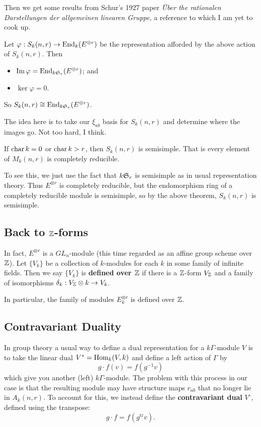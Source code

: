 \documentclass[12pt]{article}
\DeclareMathOperator{\1}{\mathbbm{1}}
\begin{document}
Then we get some results from Schur's 1927 paper \textit{\"Uber the rationalen Darstellungen der allgemeinen linearen Gruppe}, a reference to which I am yet to cook up.
\begin{thm}[Schur]
	Let $\varphi:S_k(n,r)\to \operatorname{End}_k(E^{\otimes r})$ be the representation afforded by the above action of $S_k(n,r)$. Then 
	\begin{itemize}
		\item $\operatorname{Im} \varphi=\operatorname{End}_{k\mathfrak{S}_r}(E^{\otimes r})$; and 
		\item $\ker\varphi=0$.
	\end{itemize}
	So $S_k(n,r)\cong \operatorname{End}_{k\mathfrak{S}_r}(E^{\otimes r})$.
\end{thm}
The idea here is to take our $\xi_{ab}$ basis for $S_k(n,r)$ and determine where the images go. Not too hard, I think.
\begin{cor}[Schur]
	If $\operatorname{char} k=0$ or $\operatorname{char} k>r$, then $S_k(n,r)$ is semisimple. That is every element of $M_k(n,r)$ is completely reducible.
\end{cor}
To see this, we just use the fact that $k\mathfrak{S}_r$ is semisimple as in usual representation theory. Thus $E^{\otimes r}$ is 
completely reducible, but the endomorphism ring of a completely reducible module is semisimple, so by the above theorem, $S_k(n,r)$ is semisimple.

\subsection{Back to \texorpdfstring{$\mathbb{Z}$}{Z}-forms}
In fact, $E^{\otimes r}$ is a $GL_n$-module (this time regarded as an affine group scheme over $\mathbb{Z}$). Let $\{V_k\}$ be a collection 
of $k$-modules for each $k$ in some family of infinite fields. Then we say $\{V_k\}$ is \textbf{defined over $\mathbb{Z}$} if there is a $\mathbb{Z}$-form $V_{\mathbb{Z}}$
and a family of isomorphisms $\delta_k:V_{\mathbb{Z}}\otimes k\to V_k$.

In particular, the family of modules $E^{\otimes r}_k$ is defined over $\mathbb{Z}$.

\subsection{Contravariant Duality}
In group theory a usual way to define a dual representation for a $k\Gamma$-module $V$ is to take the linear 
dual $V^\ast=\operatorname{Hom}_k(V,k)$ and define a left action of $\Gamma$ by 
\[g\cdot f(v)=f(g^{-1}v)\]
which give you another (left) $k\Gamma$-module. The problem with this process in our case is that the resulting 
module may have structure maps $r_{ab}$ that no longer lie in $A_k(n,r)$. To account for this, we instead define the 
\textbf{contravariant dual} $V^\circ$, defined using the transpose:
\[g\cdot f=f(g^{\text{tr}}v).\]
\end{document}
